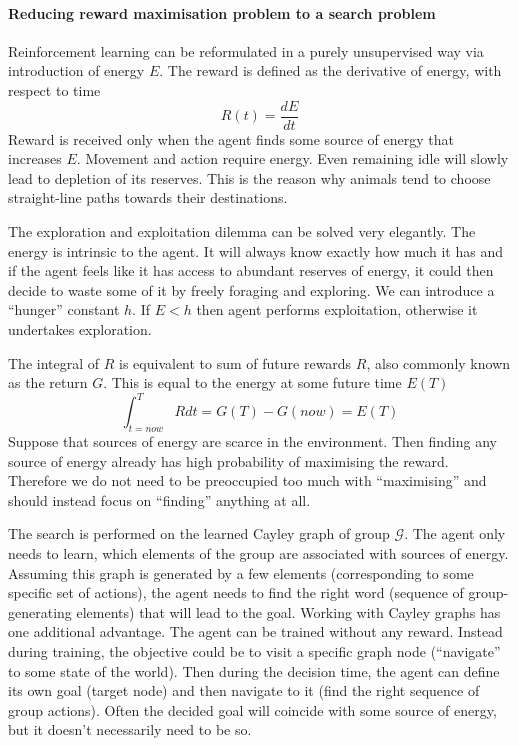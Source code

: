 \documentclass[12pt]{article}
\begin{document}
\paragraph{Reducing reward maximisation problem to a search problem}
Reinforcement learning can be reformulated in a purely unsupervised way via introduction of energy $E$. The reward is defined as the derivative of energy, with respect to time
\[
R(t) = \frac{dE}{dt}
\]
Reward is received only when the agent finds some source of energy that increases $E$.
Movement and action require energy. Even remaining idle will slowly lead to depletion of its reserves. This is the reason why animals tend to choose straight-line paths towards their destinations. 

The exploration and exploitation dilemma can be solved very elegantly. The energy is intrinsic to the agent. It will always know exactly how much it has and if the agent feels like it has access to abundant reserves of energy, it could then decide to waste some of it by freely foraging and exploring. We can introduce a ``hunger'' constant  $h$. If $E<h$ then agent performs exploitation, otherwise it undertakes exploration.

The integral of $R$ is equivalent to sum of future rewards $R$, also commonly known as the return $G$. This is equal to the energy at some future time $E(T)$
\[
\int_{t=now}^{T} R dt = G(T) - G(now) = E(T)
\]
Suppose that sources of energy are scarce in the environment. Then finding any source of energy already has high probability of maximising the reward. Therefore we do not need to be preoccupied too much with ``maximising'' and should instead focus on ``finding'' anything at all. 

The search is performed on the learned Cayley graph of group $\mathcal{G}$. The agent only needs to learn, which elements of the group are associated with sources of energy. Assuming this graph is generated by a few elements (corresponding to some specific set of actions), the agent needs to find the right word (sequence of group-generating elements) that will lead to the goal. Working with Cayley graphs has one additional advantage. The agent can be trained without any reward. Instead during training, the objective could be to visit a specific graph node (``navigate'' to some state of the world).  Then during the decision time, the agent can define its own goal (target node) and then navigate to it (find the right sequence of group actions). Often the decided goal will coincide with some source of energy, but it doesn't necessarily need to be so.
\end{document}
